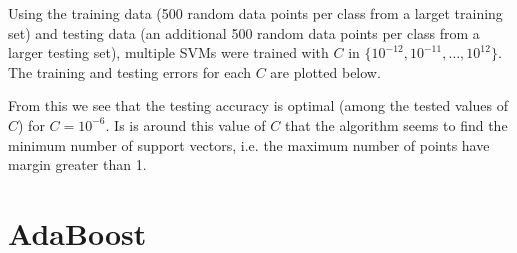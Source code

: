\documentclass{article}
\begin{document}
\begin{enumerate}
			Using the training data (500 random data points per class from a larget training set) and testing data (an additional 500 random data points per class from a larger testing set), multiple SVMs were trained with $C$ in $\{ 10^{-12}, 10^{-11}, \dots, 10^{12}\}$. The training and testing errors for each $C$ are plotted below.
			\begin{figure}[H]
                                \centering
                        \end{figure}
			From this we see that the testing accuracy is optimal (among the tested values of $C$) for $C=10^{-6}$. Is is around this value of $C$ that the algorithm seems to find the minimum number of support vectors, i.e. the maximum number of points have margin greater than 1.
	\end{enumerate}



\section{AdaBoost}
\end{document}

